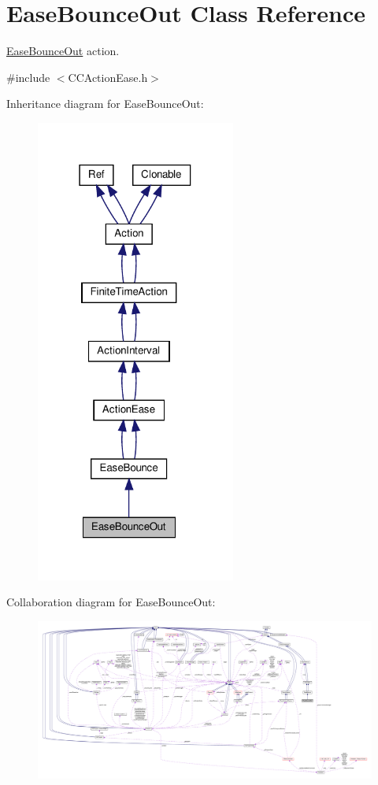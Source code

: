 \hypertarget{classEaseBounceOut}{}\section{Ease\+Bounce\+Out Class Reference}
\label{classEaseBounceOut}


\hyperlink{classEaseBounceOut}{Ease\+Bounce\+Out} action.  




{\ttfamily \#include $<$C\+C\+Action\+Ease.\+h$>$}



Inheritance diagram for Ease\+Bounce\+Out\+:
\nopagebreak
\begin{figure}[H]
\begin{center}
\leavevmode
\includegraphics[width=186pt]{classEaseBounceOut__inherit__graph}
\end{center}
\end{figure}


Collaboration diagram for Ease\+Bounce\+Out\+:
\nopagebreak
\begin{figure}[H]
\begin{center}
\leavevmode
\includegraphics[width=350pt]{classEaseBounceOut__coll__graph}
\end{center}
\end{figure}
